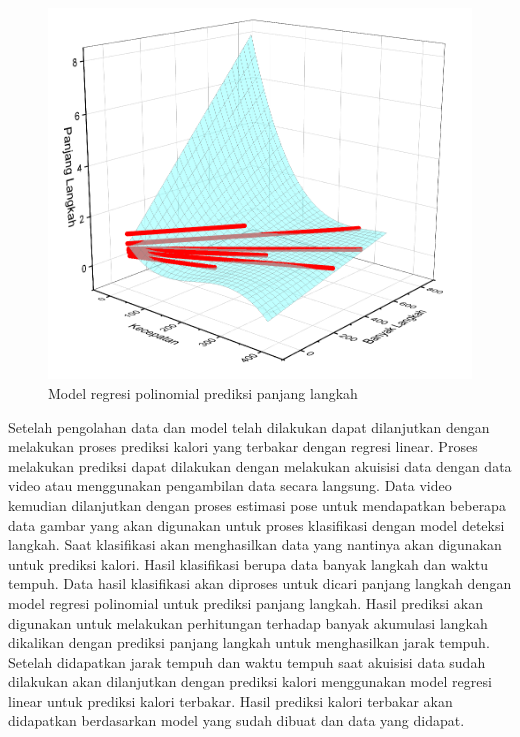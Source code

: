 \begin{figure}[H]
  \centering
  \includegraphics[scale=0.4]{gambar/model regresi panjang.png}
  \caption{Model regresi polinomial prediksi panjang langkah}
  \label{fig:ModelRegresiPanjang}
\end{figure}

Setelah pengolahan data dan model telah dilakukan dapat dilanjutkan dengan melakukan proses prediksi kalori yang terbakar dengan regresi linear. Proses melakukan prediksi dapat dilakukan dengan melakukan akuisisi data dengan data video atau menggunakan pengambilan data secara langsung. Data video kemudian dilanjutkan dengan proses estimasi pose untuk mendapatkan beberapa data gambar yang akan digunakan untuk proses klasifikasi dengan model deteksi langkah. Saat klasifikasi akan menghasilkan data yang nantinya akan digunakan untuk prediksi kalori. Hasil klasifikasi berupa data banyak langkah dan waktu tempuh. Data hasil klasifikasi akan diproses untuk dicari panjang langkah dengan model regresi polinomial untuk prediksi panjang langkah. Hasil prediksi akan digunakan untuk melakukan perhitungan terhadap banyak akumulasi langkah dikalikan dengan prediksi panjang langkah untuk menghasilkan jarak tempuh. Setelah didapatkan jarak tempuh dan waktu tempuh saat akuisisi data sudah dilakukan akan dilanjutkan dengan prediksi kalori menggunakan model regresi linear untuk prediksi kalori terbakar. Hasil prediksi kalori terbakar akan didapatkan berdasarkan model yang sudah dibuat dan data yang didapat.


